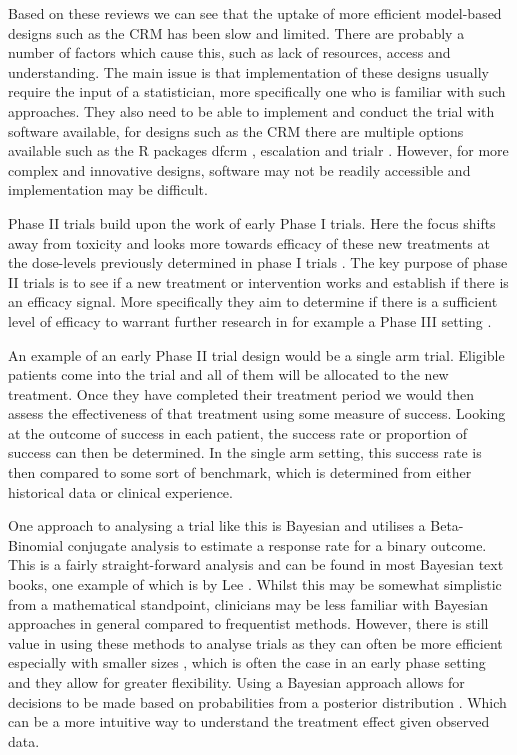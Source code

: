 Based on these reviews we can see that the uptake of more efficient model-based designs such as the CRM has been slow and limited. There are probably a number of factors which cause this, such as lack of resources, access and understanding. The main issue is that implementation of these designs usually require the input of a statistician, more specifically one who is familiar with such approaches. They also need to be able to implement and conduct the trial with software available, for designs such as the CRM there are multiple options available such as the R packages dfcrm \cite{cheungDfcrmDoseFindingContinual2019}, escalation \cite{brockModularApproachDose2020} and trialr \cite{brockTrialrClinicalTrial2023}. However, for more complex and innovative designs, software may not be readily accessible and implementation may be difficult.

Phase \RN{2} trials build upon the work of early Phase \RN{1} trials. Here the focus shifts away from toxicity and looks more towards efficacy of these new treatments at the dose-levels previously determined in phase \RN{1} trials \cite{berryBayesianAdaptiveMethods2010}. The key purpose of phase \RN{2} trials is to see if a new treatment or intervention works and establish if there is an efficacy signal. More specifically they aim to determine if there is a sufficient level of efficacy to warrant further research in for example a Phase \RN{3} setting \cite{juliousIntroductionStatisticsEarly2010}.

An example of an early Phase \RN{2} trial design would be a single arm trial. Eligible patients come into the trial 
and all of them will be allocated to the new treatment. Once they have completed their treatment period we would then assess the effectiveness of that treatment using some measure of success. Looking at the outcome of success in each patient, the success rate or proportion of success can then be determined. In the single arm setting, this success rate is then compared to some sort of benchmark, which is determined from either historical data or clinical experience.

One approach to analysing a trial like this is Bayesian and utilises a Beta-Binomial conjugate analysis to estimate a response rate for a binary outcome. This is a fairly straight-forward analysis and can be found in most Bayesian text books, one example of which is by Lee \cite{leeBayesianStatisticsIntroduction2012}. Whilst this may be somewhat simplistic from a mathematical standpoint, clinicians may be less familiar with Bayesian approaches in general compared to frequentist methods. However, there is still value in using these methods to analyse trials as they can often be more efficient especially with smaller sizes \cite{inoueRelationshipBayesianFrequentist2005}, which is often the case in an early phase setting and they allow for greater flexibility. Using a Bayesian approach allows for decisions to be made based on probabilities from a posterior distribution \cite{savilleUtilityBayesianPredictive2014}. Which can be a more intuitive way to understand the treatment effect given observed data.    

